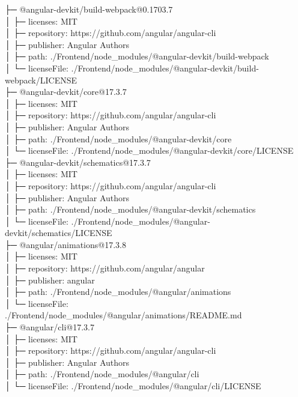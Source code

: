 ├─ @angular-devkit/build-webpack@0.1703.7\\
│  ├─ licenses: MIT\\
│  ├─ repository: https://github.com/angular/angular-cli\\
│  ├─ publisher: Angular Authors\\
│  ├─ path: ./Frontend/node\_modules/@angular-devkit/build-webpack\\
│  └─ licenseFile: ./Frontend/node\_modules/@angular-devkit/build-webpack/LICENSE\\
├─ @angular-devkit/core@17.3.7\\
│  ├─ licenses: MIT\\
│  ├─ repository: https://github.com/angular/angular-cli\\
│  ├─ publisher: Angular Authors\\
│  ├─ path: ./Frontend/node\_modules/@angular-devkit/core\\
│  └─ licenseFile: ./Frontend/node\_modules/@angular-devkit/core/LICENSE\\
├─ @angular-devkit/schematics@17.3.7\\
│  ├─ licenses: MIT\\
│  ├─ repository: https://github.com/angular/angular-cli\\
│  ├─ publisher: Angular Authors\\
│  ├─ path: ./Frontend/node\_modules/@angular-devkit/schematics\\
│  └─ licenseFile: ./Frontend/node\_modules/@angular-devkit/schematics/LICENSE\\
├─ @angular/animations@17.3.8\\
│  ├─ licenses: MIT\\
│  ├─ repository: https://github.com/angular/angular\\
│  ├─ publisher: angular\\
│  ├─ path: ./Frontend/node\_modules/@angular/animations\\
│  └─ licenseFile: ./Frontend/node\_modules/@angular/animations/README.md\\
├─ @angular/cli@17.3.7\\
│  ├─ licenses: MIT\\
│  ├─ repository: https://github.com/angular/angular-cli\\
│  ├─ publisher: Angular Authors\\
│  ├─ path: ./Frontend/node\_modules/@angular/cli\\
│  └─ licenseFile: ./Frontend/node\_modules/@angular/cli/LICENSE\\
